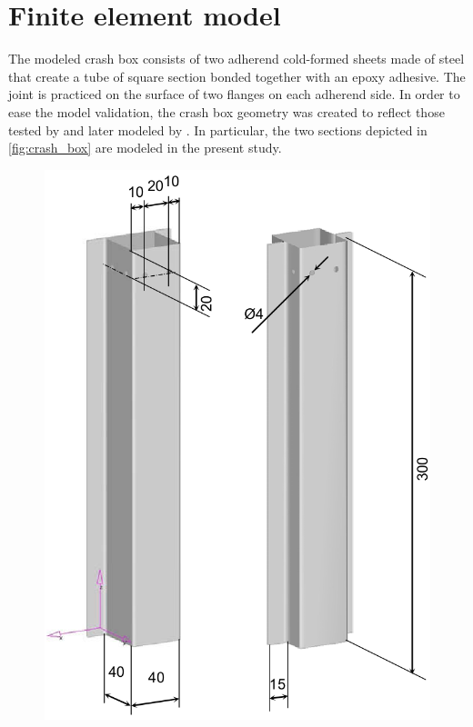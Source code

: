 \documentclass[cmfonts]{witpress}
\begin{document}
\section{Finite element model}
The modeled crash box consists of two adherend cold-formed sheets made of steel that create a tube of square section bonded together with an epoxy adhesive. The joint is practiced on the surface of two flanges on each adherend side. In order to ease the model validation, the crash box geometry was created to reflect those tested by \cite{Peroni2009} and later modeled by \cite{Scattina2011}. In particular, the two sections depicted in \cref{fig:crash_box} are modeled in the present study.

\begin{figure}[ht]
  \centering
  \begin{minipage}[b]{.48\linewidth}
    \centering
    \includegraphics[width=\linewidth]{figures/IMG_CUTRES/medidas_cb}

\end{minipage}
\end{figure}
\end{document}
